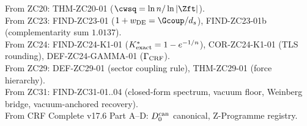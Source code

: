 \documentclass[12pt, a4paper]{article}
\begin{document}
\begin{formalbox}[title={Atomic Units Inherited (not modified)}]
From ZC20: THM-ZC20-01 ($\cwsq = \ln n/\ln|\Zft|$).\\
From ZC23: FIND-ZC23-01 ($1+w_{\rm DE} = \Gcoup/d_s$),
  FIND-ZC23-01b (complementarity sum $1.0137$).\\
From ZC24: FIND-ZC24-K1-01 ($K^*_{\rm exact} = 1 - e^{-1/n}$),
  COR-ZC24-K1-01 (TLS rounding), DEF-ZC24-GAMMA-01
  ($\Gamma_{\rm CRF}$).\\
From ZC29: DEF-ZC29-01 (sector coupling rule), THM-ZC29-01
  (force hierarchy).\\
From ZC31: FIND-ZC31-01..04 (closed-form spectrum, vacuum
  floor, Weinberg bridge, vacuum-anchored recovery).\\
From CRF Complete v17.6 Part A--D: $D_0^{\rm can}$
  canonical, Z-Programme registry.
\end{formalbox}
\end{document}
